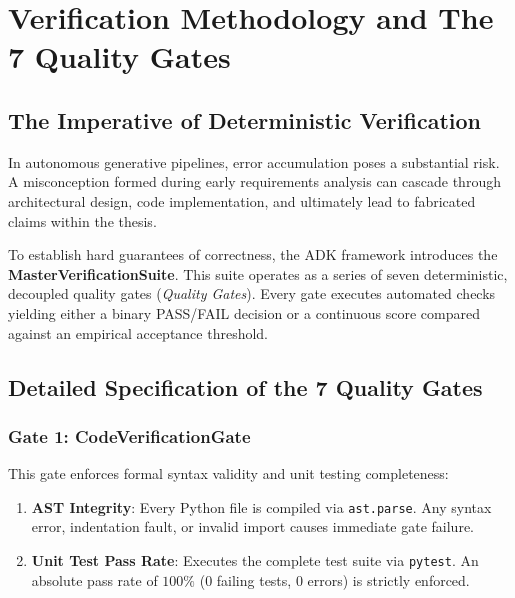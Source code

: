 \chapter{Verification Methodology and The 7 Quality Gates}
\label{chap:verification_gates}

\section{The Imperative of Deterministic Verification}
\label{sec:verification_imperative}

In autonomous generative pipelines, error accumulation poses a substantial risk. A misconception formed during early requirements analysis can cascade through architectural design, code implementation, and ultimately lead to fabricated claims within the thesis.

To establish hard guarantees of correctness, the ADK framework introduces the \textbf{MasterVerificationSuite}. This suite operates as a series of seven deterministic, decoupled quality gates (\emph{Quality Gates}). Every gate executes automated checks yielding either a binary PASS/FAIL decision or a continuous score compared against an empirical acceptance threshold.

\section{Detailed Specification of the 7 Quality Gates}
\label{sec:gate_specifications}

\subsection{Gate 1: CodeVerificationGate}
This gate enforces formal syntax validity and unit testing completeness:
\begin{enumerate}
    \item \textbf{AST Integrity}: Every Python file is compiled via \texttt{ast.parse}. Any syntax error, indentation fault, or invalid import causes immediate gate failure.
    \item \textbf{Unit Test Pass Rate}: Executes the complete test suite via \texttt{pytest}. An absolute pass rate of $100\%$ ($0$ failing tests, $0$ errors) is strictly enforced.
\end{enumerate}


